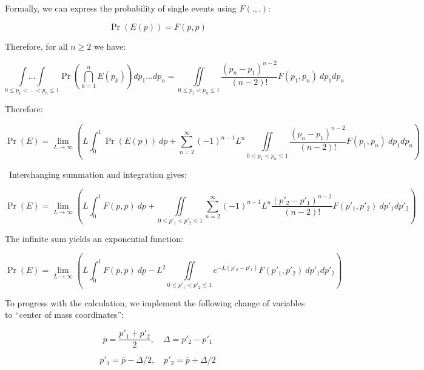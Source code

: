 \documentclass{article}
\newcommand{\warning}{{\fontencoding{U}\fontfamily{futs}\selectfont\char 49\relax} \ }
\theoremstyle{definition}
\begin{document}
Formally, we can express the probability of single events using $F(.,.)$:

\begin{equation}
    \Pr(E(p)) = F(p,p)
\end{equation}

Therefore, for all $n\ge 2$ we have:

\begin{equation}
    \underset{0 \le p_1 < \dots < p_n \le 1}{\int\dots\int}
    \Pr \left ( 
    \bigcap_{k=1}^n E(p_k)
    \right ) 
    dp_1\dots dp_n
    =
    \iint\limits_{0 \le p_1 < p_n \le 1}
    \frac{(p_n-p_1)^{n-2}}{(n-2)!}
    F(p_1,p_n) \ dp_1 dp_n
\end{equation}

Therefore:

\begin{equation}
 \Pr(E) = \lim_{L \to \infty} 
    \left (
    L \int_{0}^1 \Pr(E(p)) \ dp + 
    \sum_{n=2}^\infty (-1)^{n-1} L^n
    \iint\limits_{0 \le p_1 < p_n \le 1}
    \frac{(p_n-p_1)^{n-2}}{(n-2)!}
    F(p_1,p_n) \ dp_1 dp_n
    \right )
\end{equation}

\warning Interchanging summation and integration gives:

\begin{equation}
 \Pr(E) = \lim_{L \to \infty} 
    \left (
    L \int_{0}^1 F(p,p) \ dp + 
    \iint\limits_{0 \le p'_1 < p'_2 \le 1}
    \sum_{n=2}^\infty (-1)^{n-1} L^n
    \frac{(p'_2-p'_1)^{n-2}}{(n-2)!}
    F(p'_1,p'_2) \ dp'_1 dp'_2
    \right )
\end{equation}

The infinite sum yields an exponential function:

\begin{equation}
 \Pr(E) = \lim_{L \to \infty} 
    \left (
    L \int_{0}^1 F(p,p) \ dp - 
    L^2
    \iint\limits_{0 \le p'_1 < p'_2 \le 1}
    e^{-L (p'_2-p'_1)}
    F(p'_1,p'_2) \ dp'_1 dp'_2
    \right )
\end{equation}

To progress with the calculation, we implement the following change of variables to ``center of mass coordinates'':

\begin{equation}
    \overline{p}= \frac{p'_1+p'_2}{2}, \quad
    \Delta = p'_2-p'_1
\end{equation}

\begin{equation}
    p'_1 = \overline{p} - \Delta/2, \quad
    p'_2 = \overline{p} + \Delta/2
\end{equation}
\end{document}
